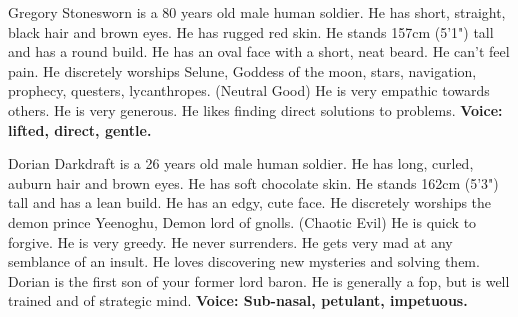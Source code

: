Gregory Stonesworn is a 80 years old male human soldier.
He has short, straight, black hair and brown eyes.
He has rugged red skin.
He stands 157cm (5'1") tall and has a round build.
He has an oval face with a short, neat beard.
He can't feel pain.
He discretely worships Selune, Goddess of the moon, stars, navigation, prophecy, questers, lycanthropes. (Neutral Good)
He is very empathic towards others.
He is very generous.
He likes finding direct solutions to problems.
\textbf{Voice: lifted, direct, gentle.}

Dorian Darkdraft is a 26 years old male human soldier.
He has long, curled, auburn hair and brown eyes.
He has soft chocolate skin.
He stands 162cm (5'3") tall and has a lean build.
He has an edgy, cute face.
He discretely worships the demon prince Yeenoghu, Demon lord of gnolls. (Chaotic Evil)
He is quick to forgive.
He is very greedy.
He never surrenders.
He gets very mad at any semblance of an insult.
He loves discovering new mysteries and solving them.
Dorian is the first son of your former lord baron.
He is generally a fop, but is well trained and of strategic mind.
\textbf{Voice: Sub-nasal, petulant, impetuous.}

\hrulefill
\clearpage

